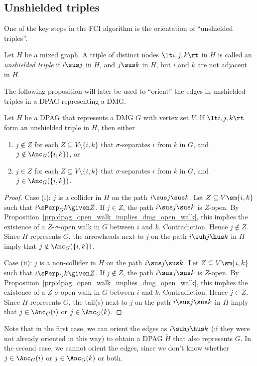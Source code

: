 \subsection{Unshielded triples}

One of the key steps in the FCI algorithm is the orientation of ``unshielded triples''.
\begin{Def}\label{def:unshielded_triple}
  Let $H$ be a mixed graph. A triple of distinct nodes $\lt i,j,k \rt$ in $H$ is called
  an \emph{unshielded triple} if $i \sus j$ in $H$, and $j \sus k$ in $H$, but
  $i$ and $k$ are not adjacent in $H$.
\end{Def}
The following proposition will later be used to ``orient'' the edges in unshielded triples
in a DPAG representing a DMG.

\begin{Prp}\label{prp:orienting_unshielded_triples}
  Let $H$ be a DPAG that represents a DMG $G$ with vertex set $V$.
  If $\lt i, j, k \rt$ form an unshielded triple in $H$, then
  either 
  \begin{enumerate}[label=(\roman*)]
    \item $j \notin Z$ for each $Z \subseteq V \setminus \{i,k\}$ that $\sigma$-separates $i$ from $k$ in $G$, and $j \notin \Anc_G(\{i,k\})$, or
    \item $j \in Z$ for each $Z \subseteq V \setminus \{i,k\}$ that $\sigma$-separates $i$ from $k$ in $G$, and $j \in \Anc_G(\{i,k\})$.
  \end{enumerate}
\end{Prp}
\begin{proof}
  Case (i): $j$ is a collider in $H$ on the path $i \sus j \sus k$.
  Let $Z \subseteq V \sm \{i,k\}$ such that $i \sPerp_G k \given Z$. 
  If $j \in Z$, the path $i \sus j \sus k$ is $Z$-open.
  By Proposition~\ref{prp:dpag_open_walk_implies_dmg_open_walk}, this implies the existence of a $Z$-$\sigma$-open walk in $G$ between $i$ and $k$.
  Contradiction. 
  Hence $j \notin Z$.
  Since $H$ represents $G$, the arrowheads next to $j$ on the path $i \suh j \hus k$ in $H$ imply that $j \notin \Anc_G(\{i,k\})$.

  Case (ii): $j$ is a non-collider in $H$ on the path $i \sus j \sus k$.
  Let $Z \subseteq V \sm \{i,k\}$ such that $i \sPerp_G k \given Z$. 
  If $j \notin Z$, the path $i \sus j \sus k$ is $Z$-open.
  By Proposition~\ref{prp:dpag_open_walk_implies_dmg_open_walk}, this implies the existence of a $Z$-$\sigma$-open walk in $G$ between $i$ and $k$.
  Contradiction. 
  Hence $j \in Z$.
  Since $H$ represents $G$, the tail(s) next to $j$ on the path $i \sus j \sus k$ in $H$ imply that $j \in \Anc_G(i)$ or $j \in \Anc_G(k)$.
\end{proof}
Note that in the first case, we can orient the edges as $i \suh j \hus k$ (if they were not already oriented in this way) to obtain a DPAG $\tilde{H}$ that also represents $G$. 
In the second case, we cannot orient the edges, since we don't know whether $j \in \Anc_G(i)$ or $j \in \Anc_G(k)$ or both.


